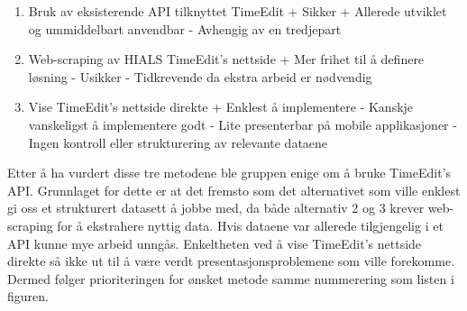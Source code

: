 \documentclass[../main.tex]{subfiles}
\begin{document}
\begin{enumerate}
\item Bruk av eksisterende API tilknyttet TimeEdit\newline
+ Sikker\newline
+ Allerede utviklet og ummiddelbart anvendbar\newline
-  Avhengig av en tredjepart\newline
\item Web-scraping av HIALS TimeEdit’s nettside\newline
+ Mer frihet til å definere løsning\newline
-  Usikker\newline
-  Tidkrevende da ekstra arbeid er nødvendig\newline
\item Vise TimeEdit’s nettside direkte\newline
+ Enklest å implementere\newline
-  Kanskje vanskeligst å implementere godt\newline
-  Lite presenterbar på mobile applikasjoner\newline
-  Ingen kontroll eller strukturering av relevante dataene\newline
\end{enumerate}

Etter å ha vurdert disse tre metodene ble gruppen enige om å bruke TimeEdit’s API. Grunnlaget for dette er at det fremsto som det alternativet som ville enklest gi oss et strukturert datasett å jobbe med, da både alternativ 2 og 3 krever web-scraping for å ekstrahere nyttig data. Hvis dataene var allerede tilgjengelig i et API kunne mye arbeid unngås. Enkeltheten ved å vise TimeEdit’s nettside direkte så ikke ut til å være verdt presentasjonsproblemene som ville forekomme. Dermed følger prioriteringen for ønsket metode samme nummerering som listen i figuren.
\end{document}
